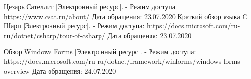 \newpage

\begin{thebibliography}{}
	 Цезарь Сателлит [Электронный ресурс]. -
	Режим доступа: https://www.csat.ru/about/
	Дата обращения: 23.07.2020
	 Краткий обзор языка C Шарп [Электронный ресурс]. -
	Режим доступа: https://docs.microsoft.com/ru-ru/dotnet/csharp/tour-of-csharp/
	Дата обращения: 23.07.2020
	
	 Обзор Windows Forms [Электронный ресурс]. -
	Режим доступа: https://docs.microsoft.com/ru-ru/dotnet/framework/winforms/windows-forms-overview
	Дата обращения: 24.07.2020
\end{thebibliography}